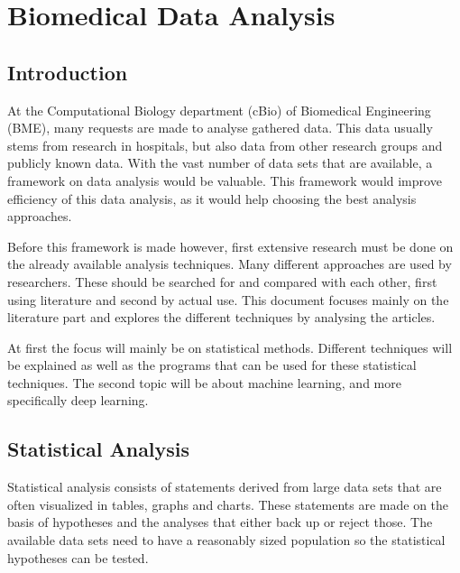 \documentclass[10pt,a4paper]{report}
\begin{document}
	
	\chapter{Biomedical Data Analysis}
	\label{app:BiomedicalDataAnalysis}
	
	\section{Introduction}
	
	At the Computational Biology department (cBio) of Biomedical Engineering (BME), many requests are made to analyse gathered data. This data usually stems from research in hospitals, but also data from other research groups and publicly known data. With the vast number of data sets that are available, a framework on data analysis would be valuable. This framework would improve efficiency of this data analysis, as it would help choosing the best analysis approaches. 
	
	Before this framework is made however, first extensive research must be done on the already available analysis techniques. Many different approaches are used by researchers. These should be searched for and compared with each other, first using literature and second by actual use. This document focuses mainly on the literature part and explores the different techniques by analysing the articles.
	
	At first the focus will mainly be on statistical methods. Different 
	techniques will be explained as well as the programs that can be used for 
	these statistical techniques. The second topic will be about machine 
	learning, and more specifically deep learning. 
	
	\clearpage
	
	\section{Statistical Analysis}
	
	Statistical analysis consists of statements derived from large data sets that are often visualized in tables, graphs and charts. These statements are made on the basis of hypotheses and the analyses that either back up or reject those. The available data sets need to have a reasonably sized population so the statistical hypotheses can be tested.  \cite{woolson2011statistical} 
	
\end{document}
